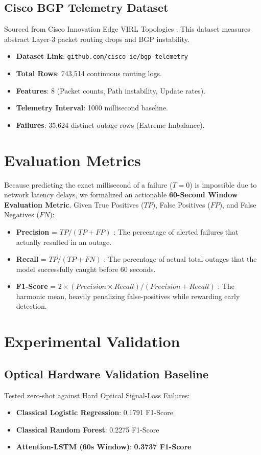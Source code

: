 \documentclass[conference]{IEEEtran}
\begin{document}
\subsection{Cisco BGP Telemetry Dataset}
Sourced from Cisco Innovation Edge VIRL Topologies \cite{li2019bgp}. This dataset measures abstract Layer-3 packet routing drops and BGP instability.
\begin{itemize}
    \item \textbf{Dataset Link}: \texttt{github.com/cisco-ie/bgp-telemetry}
    \item \textbf{Total Rows}: 743,514 continuous routing logs.
    \item \textbf{Features}: 8 (Packet counts, Path instability, Update rates).
    \item \textbf{Telemetry Interval}: 1000 millisecond baseline.
    \item \textbf{Failures}: 35,624 distinct outage rows (Extreme Imbalance).
\end{itemize}

\section{Evaluation Metrics}
Because predicting the exact millisecond of a failure ($T=0$) is impossible due to network latency delays, we formalized an actionable \textbf{60-Second Window Evaluation Metric}. 
Given True Positives ($TP$), False Positives ($FP$), and False Negatives ($FN$):
\begin{itemize}
    \item \textbf{Precision} = $TP / (TP + FP)$ : The percentage of alerted failures that actually resulted in an outage.
    \item \textbf{Recall} = $TP / (TP + FN)$ : The percentage of actual total outages that the model successfully caught before 60 seconds.
    \item \textbf{F1-Score} = $2 \times (Precision \times Recall) / (Precision + Recall)$ : The harmonic mean, heavily penalizing false-positives while rewarding early detection.
\end{itemize}

\section{Experimental Validation}

\subsection{Optical Hardware Validation Baseline}
Tested zero-shot against Hard Optical Signal-Loss Failures:
\begin{itemize}
    \item \textbf{Classical Logistic Regression}: 0.1791 F1-Score
    \item \textbf{Classical Random Forest}: 0.2275 F1-Score
    \item \textbf{Attention-LSTM (60s Window)}: \textbf{0.3737 F1-Score}
\end{itemize}
\end{document}
